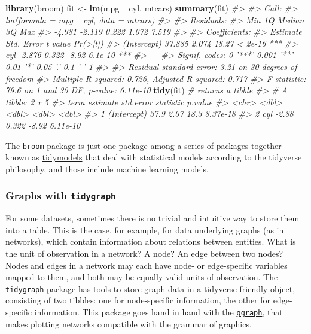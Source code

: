 \documentclass[]{book}
\newenvironment{Shaded}{}{}
\newcommand{\CommentTok}[1]{\textcolor[rgb]{0.38,0.63,0.69}{\textit{#1}}}
\newcommand{\KeywordTok}[1]{\textcolor[rgb]{0.00,0.44,0.13}{\textbf{#1}}}
\newcommand{\NormalTok}[1]{#1}
\newcommand{\OperatorTok}[1]{\textcolor[rgb]{0.40,0.40,0.40}{#1}}
\newcommand{\StringTok}[1]{\textcolor[rgb]{0.25,0.44,0.63}{#1}}
\begin{document}
\begin{Shaded}
\begin{Highlighting}[]
\KeywordTok{library}\NormalTok{(broom)}
\NormalTok{fit <-}\StringTok{ }\KeywordTok{lm}\NormalTok{(mpg }\OperatorTok{~}\StringTok{ }\NormalTok{cyl, mtcars)}
\KeywordTok{summary}\NormalTok{(fit)}
\CommentTok{#> }
\CommentTok{#> Call:}
\CommentTok{#> lm(formula = mpg ~ cyl, data = mtcars)}
\CommentTok{#> }
\CommentTok{#> Residuals:}
\CommentTok{#>    Min     1Q Median     3Q    Max }
\CommentTok{#> -4.981 -2.119  0.222  1.072  7.519 }
\CommentTok{#> }
\CommentTok{#> Coefficients:}
\CommentTok{#>             Estimate Std. Error t value Pr(>|t|)    }
\CommentTok{#> (Intercept)   37.885      2.074   18.27  < 2e-16 ***}
\CommentTok{#> cyl           -2.876      0.322   -8.92  6.1e-10 ***}
\CommentTok{#> ---}
\CommentTok{#> Signif. codes:  0 '***' 0.001 '**' 0.01 '*' 0.05 '.' 0.1 ' ' 1}
\CommentTok{#> }
\CommentTok{#> Residual standard error: 3.21 on 30 degrees of freedom}
\CommentTok{#> Multiple R-squared:  0.726,	Adjusted R-squared:  0.717 }
\CommentTok{#> F-statistic: 79.6 on 1 and 30 DF,  p-value: 6.11e-10}
\KeywordTok{tidy}\NormalTok{(fit) }\CommentTok{# returns a tibble}
\CommentTok{#> # A tibble: 2 x 5}
\CommentTok{#>   term        estimate std.error statistic  p.value}
\CommentTok{#>   <chr>          <dbl>     <dbl>     <dbl>    <dbl>}
\CommentTok{#> 1 (Intercept)    37.9      2.07      18.3  8.37e-18}
\CommentTok{#> 2 cyl            -2.88     0.322     -8.92 6.11e-10}
\end{Highlighting}
\end{Shaded}

The \texttt{broom} package is just one package among a series of packages together known as \href{https://www.tidymodels.org/}{tidymodels} that deal with statistical models according to the tidyverse philosophy, and those include machine learning models.

\hypertarget{graphs-with-tidygraph}{%
\subsubsection{\texorpdfstring{Graphs with \texttt{tidygraph}}{Graphs with tidygraph}}\label{graphs-with-tidygraph}}

For some datasets, sometimes there is no trivial and intuitive way to store them into a table. This is the case, for example, for data underlying graphs (as in networks), which contain information about relations between entities. What is the unit of observation in a network? A node? An edge between two nodes? Nodes and edges in a network may each have node- or edge-specific variables mapped to them, and both may be equally valid units of observation. The \href{https://www.data-imaginist.com/2017/introducing-tidygraph/}{\texttt{tidygraph}} package has tools to store graph-data in a tidyverse-friendly object, consisting of two tibbles: one for node-specific information, the other for edge-specific information. This package goes hand in hand with the \href{https://ggraph.data-imaginist.com/}{\texttt{ggraph}}, that makes plotting networks compatible with the grammar of graphics.
\end{document}
